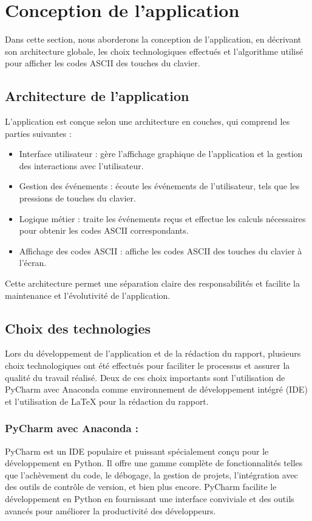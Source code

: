\documentclass[12pt,a4paper]{report}
\begin{document}
\section{Conception de l'application}

Dans cette section, nous aborderons la conception de l'application, en décrivant son architecture globale, les choix technologiques effectués et l'algorithme utilisé pour afficher les codes ASCII des touches du clavier.

\subsection{Architecture de l'application}

L'application est conçue selon une architecture en couches, qui comprend les parties suivantes :

\begin{itemize}
  \item Interface utilisateur : gère l'affichage graphique de l'application et la gestion des interactions avec l'utilisateur.
  \item Gestion des événements : écoute les événements de l'utilisateur, tels que les pressions de touches du clavier.
  \item Logique métier : traite les événements reçus et effectue les calculs nécessaires pour obtenir les codes ASCII correspondants.
  \item Affichage des codes ASCII : affiche les codes ASCII des touches du clavier à l'écran.
\end{itemize}

Cette architecture permet une séparation claire des responsabilités et facilite la maintenance et l'évolutivité de l'application.

\subsection{Choix des technologies}

Lors du développement de l'application et de la rédaction du rapport, plusieurs choix technologiques ont été effectués pour faciliter le processus et assurer la qualité du travail réalisé. Deux de ces choix importants sont l'utilisation de PyCharm avec Anaconda comme environnement de développement intégré (IDE) et l'utilisation de LaTeX pour la rédaction du rapport.

\subsubsection{PyCharm avec Anaconda :} 
PyCharm est un IDE populaire et puissant spécialement conçu pour le développement en Python. Il offre une gamme complète de fonctionnalités telles que l'achèvement du code, le débogage, la gestion de projets, l'intégration avec des outils de contrôle de version, et bien plus encore. PyCharm facilite le développement en Python en fournissant une interface conviviale et des outils avancés pour améliorer la productivité des développeurs.
\end{document}
